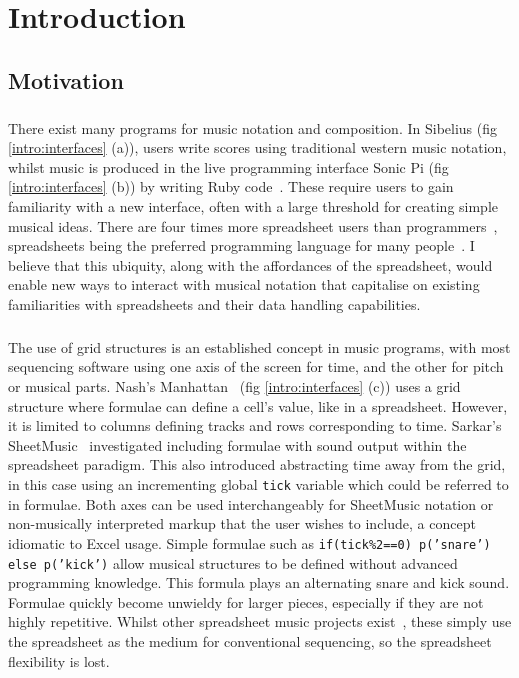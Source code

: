 
\chapter{Introduction}

\vspace{-20pt}
\section{Motivation}

\paragraph{} There exist many programs for music notation and composition. In Sibelius (fig \ref{intro:interfaces} (a)), users write scores using traditional western music notation, whilst music is produced in the live programming interface Sonic Pi (fig \ref{intro:interfaces} (b)) by writing Ruby code~\cite{aaron:pi}. These require users to gain familiarity with a new interface, often with a large threshold for creating simple musical ideas. There are four times more spreadsheet users than programmers~\cite{scaffidi:estimating}, spreadsheets being the preferred programming language for many people~\cite{blackwell:functions}. I believe that this ubiquity, along with the affordances of the spreadsheet, would enable new ways to interact with musical notation that capitalise on existing familiarities with spreadsheets and their data handling capabilities.

\paragraph{} The use of grid structures is an established concept in music programs, with most sequencing software using one axis of the screen for time, and the other for pitch or musical parts. Nash's Manhattan~\cite{nash:manhattan} (fig \ref{intro:interfaces} (c)) uses a grid structure where formulae can define a cell's value, like in a spreadsheet. However, it is limited to columns defining tracks and rows corresponding to time. Sarkar's SheetMusic~\cite{sarkar:sheetmusic} investigated including formulae with sound output within the spreadsheet paradigm. This also introduced abstracting time away from the grid, in this case using an incrementing global \texttt{tick} variable which could be referred to in formulae. Both axes can be used interchangeably for SheetMusic notation or non-musically interpreted markup that the user wishes to include, a concept idiomatic to Excel usage. Simple formulae such as \texttt{if(tick\%2==0) p('snare') else p('kick')} allow musical structures to be defined without advanced programming knowledge. This formula plays an alternating snare and kick sound. Formulae quickly become unwieldy for larger pieces, especially if they are not highly repetitive. Whilst other spreadsheet music projects exist~\cite{hackaday:spreadsheet}, these simply use the spreadsheet as the medium for conventional sequencing, so the spreadsheet flexibility is lost.


